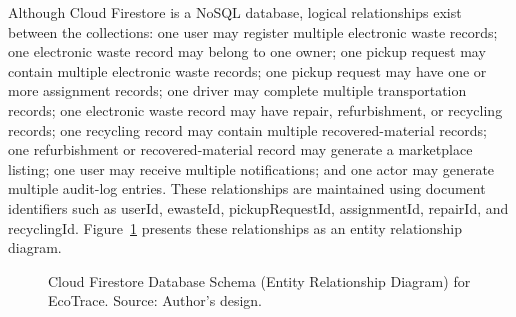 Although Cloud Firestore is a NoSQL database, logical relationships exist
between the collections: one user may register multiple electronic waste
records; one electronic waste record may belong to one owner; one pickup
request may contain multiple electronic waste records; one pickup request
may have one or more assignment records; one driver may complete multiple
transportation records; one electronic waste record may have repair,
refurbishment, or recycling records; one recycling record may contain
multiple recovered-material records; one refurbishment or recovered-material
record may generate a marketplace listing; one user may receive multiple
notifications; and one actor may generate multiple audit-log entries. These
relationships are maintained using document identifiers such as userId,
ewasteId, pickupRequestId, assignmentId, repairId, and recyclingId.
Figure~\ref{fig:er-diagram} presents these relationships as an entity
relationship diagram.

\begin{figure}[H]
  \centering
  \caption{Cloud Firestore Database Schema (Entity Relationship Diagram) for EcoTrace. Source: Author's design.}
  \label{fig:er-diagram}
\end{figure}

